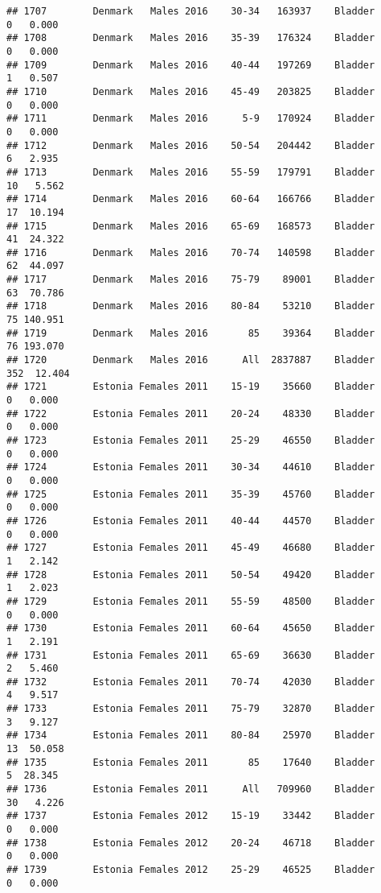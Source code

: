 \documentclass[
]{article}
\begin{document}
\begin{verbatim}
## 1707        Denmark   Males 2016    30-34   163937    Bladder      0   0.000
## 1708        Denmark   Males 2016    35-39   176324    Bladder      0   0.000
## 1709        Denmark   Males 2016    40-44   197269    Bladder      1   0.507
## 1710        Denmark   Males 2016    45-49   203825    Bladder      0   0.000
## 1711        Denmark   Males 2016      5-9   170924    Bladder      0   0.000
## 1712        Denmark   Males 2016    50-54   204442    Bladder      6   2.935
## 1713        Denmark   Males 2016    55-59   179791    Bladder     10   5.562
## 1714        Denmark   Males 2016    60-64   166766    Bladder     17  10.194
## 1715        Denmark   Males 2016    65-69   168573    Bladder     41  24.322
## 1716        Denmark   Males 2016    70-74   140598    Bladder     62  44.097
## 1717        Denmark   Males 2016    75-79    89001    Bladder     63  70.786
## 1718        Denmark   Males 2016    80-84    53210    Bladder     75 140.951
## 1719        Denmark   Males 2016       85    39364    Bladder     76 193.070
## 1720        Denmark   Males 2016      All  2837887    Bladder    352  12.404
## 1721        Estonia Females 2011    15-19    35660    Bladder      0   0.000
## 1722        Estonia Females 2011    20-24    48330    Bladder      0   0.000
## 1723        Estonia Females 2011    25-29    46550    Bladder      0   0.000
## 1724        Estonia Females 2011    30-34    44610    Bladder      0   0.000
## 1725        Estonia Females 2011    35-39    45760    Bladder      0   0.000
## 1726        Estonia Females 2011    40-44    44570    Bladder      0   0.000
## 1727        Estonia Females 2011    45-49    46680    Bladder      1   2.142
## 1728        Estonia Females 2011    50-54    49420    Bladder      1   2.023
## 1729        Estonia Females 2011    55-59    48500    Bladder      0   0.000
## 1730        Estonia Females 2011    60-64    45650    Bladder      1   2.191
## 1731        Estonia Females 2011    65-69    36630    Bladder      2   5.460
## 1732        Estonia Females 2011    70-74    42030    Bladder      4   9.517
## 1733        Estonia Females 2011    75-79    32870    Bladder      3   9.127
## 1734        Estonia Females 2011    80-84    25970    Bladder     13  50.058
## 1735        Estonia Females 2011       85    17640    Bladder      5  28.345
## 1736        Estonia Females 2011      All   709960    Bladder     30   4.226
## 1737        Estonia Females 2012    15-19    33442    Bladder      0   0.000
## 1738        Estonia Females 2012    20-24    46718    Bladder      0   0.000
## 1739        Estonia Females 2012    25-29    46525    Bladder      0   0.000

\end{verbatim}
\end{document}
